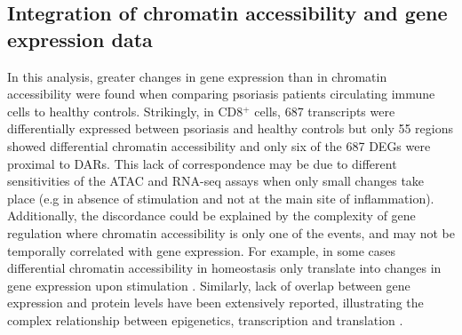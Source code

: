 



\subsection{Integration of chromatin accessibility and gene expression data}
In this analysis, greater changes in gene expression than in chromatin accessibility were found when comparing psoriasis patients circulating immune cells to healthy controls. Strikingly, in CD8$^+$ cells, 687 transcripts were differentially expressed between psoriasis and healthy controls but only 55 regions showed differential chromatin accessibility and only six of the 687 DEGs were proximal to DARs. This lack of correspondence may be due to different sensitivities of the ATAC and RNA-seq assays when only small changes take place (e.g in absence of stimulation and not at the main site of inflammation). Additionally, the discordance could be explained by the complexity of gene regulation where chromatin accessibility is only one of the events, and may not be temporally correlated with gene expression. For example, in some cases differential chromatin accessibility in homeostasis only translate into changes in gene expression upon stimulation \parencite{Alasoo2018,Calderon2018}. Similarly, lack of overlap between gene expression and protein levels have been extensively reported, illustrating the complex relationship between epigenetics, transcription and translation \parencite{Liu2016}. 




